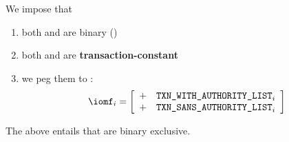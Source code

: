 We impose that
\begin{enumerate}
	\item both \transactionTypeWithAuthorityLists{} and \transactionTypeWithAuthorityLists{} are binary (\sanityCheck)
	\item both \transactionTypeWithAuthorityLists{} and \transactionTypeWithAuthorityLists{} are \textbf{transaction-constant}
	\item we peg them to \iomf{}:
		\[
			\iomf _{i}
			=
			\left[ \begin{array}{cl}
				+ & \transactionTypeWithAuthorityLists _{i} \\
				+ & \transactionTypeSansAuthorityLists _{i} \\
			\end{array} \right]
		\]
\end{enumerate}
\saNote{} \label{rlp auth: generalities: transactions with or sans authority list: exclusivity}
The above entails that
\transactionTypeWithAuthorityLists{}
\transactionTypeSansAuthorityLists{}
are binary exclusive.
